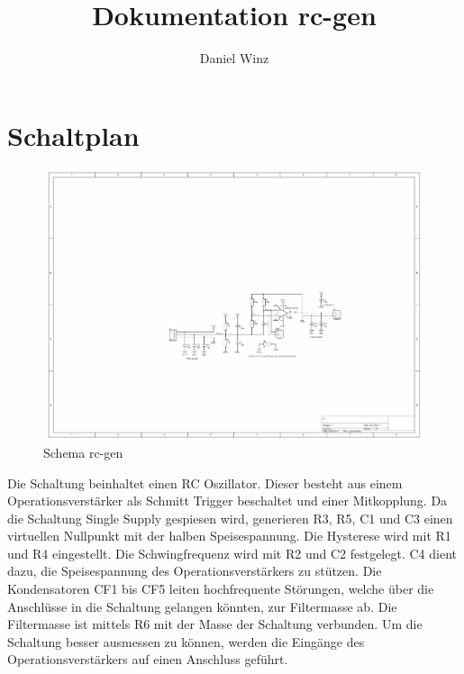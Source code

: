 \documentclass[a4paper,10pt,fleqn]{article}
\title{Dokumentation rc-gen}
\author{Daniel Winz}
\begin{document}
\maketitle
\clearpage
\tableofcontents
\clearpage

\section{Schaltplan}
\begin{figure}[h!]
    \centering
    \includegraphics[width=\textwidth]{../rc-gen/rc-gen-sch.PDF}
    \caption{Schema rc-gen}
    \label{fig:schematic}
\end{figure}
\noindent
Die Schaltung beinhaltet einen RC Oszillator. Dieser besteht aus einem 
Operationsverstärker als Schmitt Trigger beschaltet und einer Mitkopplung. 
Da die Schaltung Single Supply gespiesen wird, generieren R3, R5, C1 und C3 
einen virtuellen Nullpunkt mit der halben Speisespannung. Die Hysterese wird 
mit R1 und R4 eingestellt. Die Schwingfrequenz wird mit R2 und C2 festgelegt. 
C4 dient dazu, die Speisespannung des Operationsverstärkers zu stützen. 
Die Kondensatoren CF1 bis CF5 leiten hochfrequente Störungen, welche über 
die Anschlüsse in die Schaltung gelangen könnten, zur Filtermasse ab. 
Die Filtermasse ist mittels R6 mit der Masse der Schaltung verbunden. 
Um die Schaltung besser ausmessen zu können, werden die Eingänge des 
Operationsverstärkers auf einen Anschluss geführt. 

\clearpage
\end{document}
